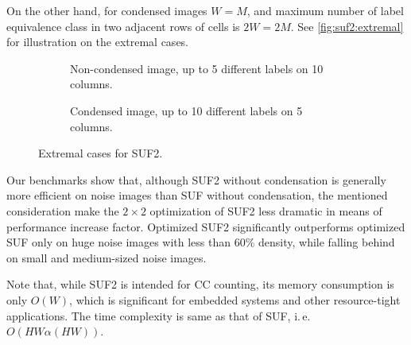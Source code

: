 \documentclass[hidelinks]{llncs}
\newcommand{\texten}[1]{#1}
\newcommand{\textru}[1]{}
\begin{document}
\texten{
On the other hand, for condensed images $W=M$, and maximum number of label
equivalence class in two adjacent rows of cells is $2W=2M$. See
\autoref{fig:suf2:extremal} for illustration on the extremal cases.
}\textru{
С другой стороны, для сжатых изображений $W=M$, и максимальное число классов
эквивалентности равно $2W=2M$. Смотри примеры на \autoref{fig:suf2:extremal}.
}

\begin{figure}
  \centering
  \begin{subfigure}{0.475\linewidth}
    \centering
    \caption{Non-condensed image, up to 5 different labels on 10 columns.}
  \end{subfigure}
  \quad
  \begin{subfigure}{0.475\linewidth}
    \centering
    \caption{Condensed image, up to 10 different labels on 5 columns.}
  \end{subfigure}
  \caption{Extremal cases for SUF2.}
  \label{fig:suf2:extremal}
\end{figure}

\texten{
Our benchmarks show that, although SUF2 without condensation is generally more
efficient on noise images than SUF without condensation, the mentioned
consideration make the $2 \times 2$ optimization
of SUF2 less dramatic in means of performance increase factor.
Optimized SUF2 significantly outperforms optimized SUF only on
huge noise images with less than 60\% density, while falling behind on
small and medium-sized noise images.
}\textru{
Проведённые эксперименты показывают, что хотя SUF2 без сжатия в целом более
эффективен, чем SUF без сжатия, приведённая оценка делает относительное
ускорение SUF2 со сжатием не таким значительным.
}

\texten{
Note that, while SUF2 is intended for CC counting, its memory
consumption is only $O(W)$, which is significant for embedded systems and
other resource-tight applications. The time complexity is same as that of SUF,
i.\,e. $O(HW\alpha(HW))$.
}\textru{
Отметим, что SUF2 решает задачу подсчёта СК, используя всего $O(W)$
дополнительной памяти.
}
\end{document}
